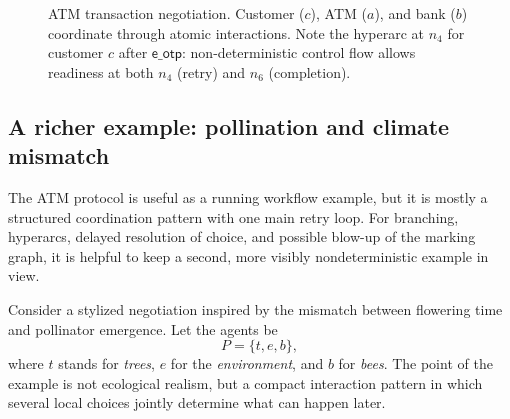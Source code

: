 \begin{figure}[t]
\caption{ATM transaction negotiation. Customer ($c$), ATM ($a$), and bank ($b$) coordinate through atomic interactions. Note the hyperarc at $n_4$ for customer $c$ after $\mathsf{e\_otp}$: non-deterministic control flow allows readiness at both $n_4$ (retry) and $n_6$ (completion).}
\label{fig:ATM}
\end{figure}

\subsection{A richer example: pollination and climate mismatch}
\label{subsec:prelim-neg-pollination}

The ATM protocol is useful as a running workflow example, but it is mostly a
structured coordination pattern with one main retry loop. For branching,
hyperarcs, delayed resolution of choice, and possible blow-up of the marking
graph, it is helpful to keep a second, more visibly nondeterministic example in
view.

Consider a stylized negotiation inspired by the mismatch between flowering time
and pollinator emergence. Let the agents be
\[
P=\{t,e,b\},
\]
where $t$ stands for \emph{trees}, $e$ for the \emph{environment}, and $b$ for
\emph{bees}. The point of the example is not ecological realism, but a compact
interaction pattern in which several local choices jointly determine what can
happen later.

